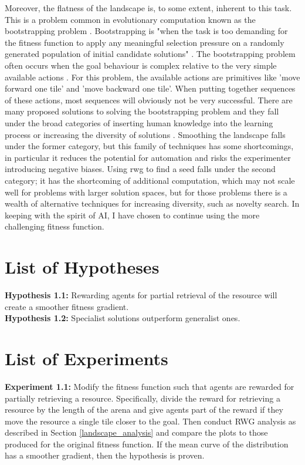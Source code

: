 \documentclass[12pt]{article}
\begin{document}
Moreover, the flatness of the landscape is, to some extent, inherent to this task.
This is a problem common in evolutionary computation known as the bootstrapping problem \cite{Silva:EC:2016, Wei:ALR:2019}.
Bootstrapping is "when the task is too demanding for the fitness function to apply any meaningful selection pressure on a randomly generated population of initial candidate solutions" \cite{Silva:EC:2016}.
The bootstrapping problem often occurs when the goal behaviour is complex relative to the very simple available actions \cite{Wei:ALR:2019}.
For this problem, the available actions are primitives like 'move forward one tile' and 'move backward one tile'.
When putting together sequences of these actions, most sequences will obviously not be very successful.
There are many proposed solutions to solving the bootstrapping problem and they fall under the broad categories of inserting human knowledge into the learning process or increasing the diversity of solutions \cite{Silva:EC:2016}.
Smoothing the landscape falls under the former category, but this family of techniques has some shortcomings, in particular it reduces the potential for automation and risks the experimenter introducing negative biases.
Using rwg to find a seed falls under the second category; it has the shortcoming of additional computation, which may not scale well for problems with larger solution spaces, but for those problems there is a wealth of alternative techniques for increasing diversity, such as novelty search.
In keeping with the spirit of AI, I have chosen to continue using the more challenging fitness function.

\section{List of Hypotheses}

\textbf{Hypothesis 1.1:} Rewarding agents for partial retrieval of the resource will create a smoother fitness gradient.\\

\textbf{Hypothesis 1.2:} Specialist solutions outperform generalist ones.\\

\section{List of Experiments}

\textbf{Experiment 1.1:} Modify the fitness function such that agents are rewarded for partially retrieving a resource.
Specifically, divide the reward for retrieving a resource by the length of the arena and give agents part of the reward if they move the resource a single tile closer to the goal.
Then conduct RWG analysis as described in Section \ref{landscape_analysis} and compare the plots to those produced for the original fitness function.
If the mean curve of the distribution has a smoother gradient, then the hypothesis is proven.\\
\end{document}
